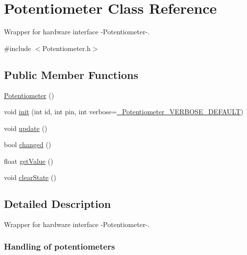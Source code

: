 \hypertarget{class_potentiometer}{}\section{Potentiometer Class Reference}
\label{class_potentiometer}


Wrapper for hardware interface -\/\+Potentiometer-\/.  




{\ttfamily \#include $<$Potentiometer.\+h$>$}

\subsection*{Public Member Functions}
\begin{DoxyCompactItemize}
\item 
\mbox{\hyperlink{class_potentiometer_a266317bbba4856942985925d044b969a}{Potentiometer}} ()
\item 
void \mbox{\hyperlink{class_potentiometer_ab1c2e1513f98952487482eb48406f1bb}{init}} (int id, int pin, int verbose=\mbox{\hyperlink{_potentiometer_8h_ada534779e17a276eadfea81c53d6bd03}{\+\_\+\+Potentiometer\+\_\+\+V\+E\+R\+B\+O\+S\+E\+\_\+\+D\+E\+F\+A\+U\+LT}})
\item 
void \mbox{\hyperlink{class_potentiometer_a56e36ed55abee08cbe81ce01687f82ad}{update}} ()
\item 
bool \mbox{\hyperlink{class_potentiometer_a518a49f1d9d85ae9bfea32fe6caff3e7}{changed}} ()
\item 
float \mbox{\hyperlink{class_potentiometer_a88c44aecdfce24a5dd0e719b94267dc6}{get\+Value}} ()
\item 
void \mbox{\hyperlink{class_potentiometer_a7307a8f883fb934f0440b2b4dc47b823}{clear\+State}} ()
\end{DoxyCompactItemize}


\subsection{Detailed Description}
Wrapper for hardware interface -\/\+Potentiometer-\/. 

\subsubsection*{Handling of potentiometers}

